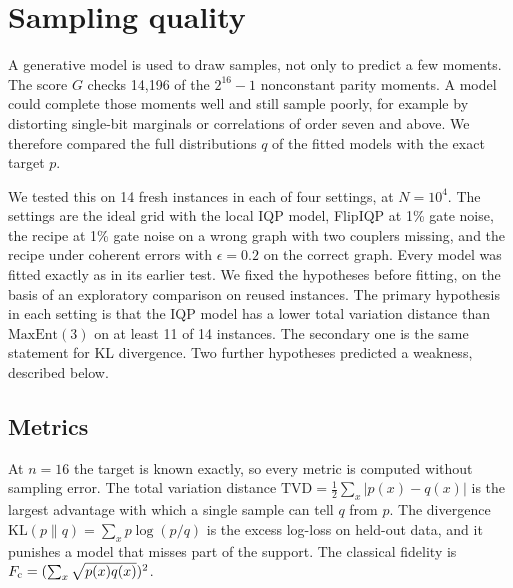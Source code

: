 \documentclass[aps,pra,twocolumn,superscriptaddress,nofootinbib]{revtex4-2}
\newcommand{\Gm}{G}
\newcommand{\ME}{\mathrm{MaxEnt}(3)}
\begin{document}
\section{Sampling quality}
\label{sec:sampling}

A generative model is used to draw samples, not only to predict a few moments.
The score $\Gm$ checks 14,196 of the $2^{16}-1$ nonconstant parity moments.
A model could complete those moments well and still sample poorly, for example by distorting single-bit marginals or
correlations of order seven and above.
We therefore compared the full distributions $q$ of the fitted models with the exact target $p$.

We tested this on 14 fresh instances in each of four settings, at $N=10^4$.
The settings are the ideal grid with the local IQP model, FlipIQP at 1\% gate noise, the recipe at 1\% gate noise on
a wrong graph with two couplers missing, and the recipe under coherent errors with $\epsilon=0.2$ on the
correct graph.
Every model was fitted exactly as in its earlier test.
We fixed the hypotheses before fitting, on the basis of an exploratory comparison on reused instances.
The primary hypothesis in each setting is that the IQP model has a lower total variation distance than $\ME$ on at
least 11 of 14 instances.
The secondary one is the same statement for KL divergence.
Two further hypotheses predicted a weakness, described below.

\subsection{Metrics}

At $n=16$ the target is known exactly, so every metric is computed without sampling error.
The total variation distance $\mathrm{TVD}=\frac12\sum_x|p(x)-q(x)|$ is the largest advantage with which a single
sample can tell $q$ from $p$.
The divergence $\mathrm{KL}(p\|q)=\sum_x p\log(p/q)$ is the excess log-loss on held-out data, and it punishes a model
that misses part of the support.
The classical fidelity is $F_{\rm c}=(\sum_x\sqrt{p(x)q(x)})^2$.
\end{document}
